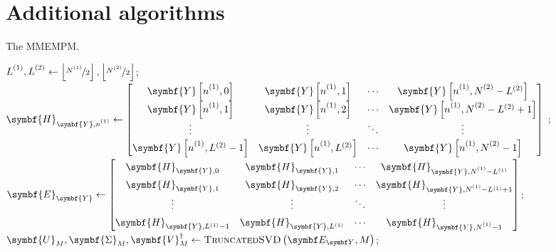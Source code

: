 \section{Additional algorithms}
\null\vfill
\begin{algorithm}[h!]
    \caption{The \acs{MMEMPM}.}
    \label{alg:mmempm}
    \begin{algorithmic}[1]
        \State $\Lone, \Ltwo \gets \left\lfloor \nicefrac{\None}{2} \right\rfloor, \left\lfloor \nicefrac{\Ntwo}{2} \right\rfloor$;
            \State  $\symbf{H}_{\symbf{Y},\none} \gets
                \def\arraystretch{1.4}
            \begin{bmatrix}
                \symbf{Y}\left[\none, 0\right] &
                \symbf{Y}\left[\none, 1\right] &
                \cdots &
                \symbf{Y}\left[\none, \Ntwo-L^{(2)}\right]\\
                \symbf{Y}\left[\none, 1\right] &
                \symbf{Y}\left[\none, 2\right] &
                \cdots &
                \symbf{Y}\left[\none, \Ntwo-L^{(2)}+1\right]\\
                \vdots & \vdots & \ddots & \vdots\\
                \symbf{Y}\left[\none, L^{(2)} - 1\right] &
                \symbf{Y}\left[\none, L^{(2)}\right] &
                \cdots &
                \symbf{Y}\left[\none, \Ntwo-1\right]\\
            \end{bmatrix}
        $
        \EndFor;
        \State $\symbf{E}_{\symbf{Y}} \gets
        \begin{bmatrix}
            \symbf{H}_{\symbf{Y},0} & \symbf{H}_{\symbf{Y},1} & \cdots & \symbf{H}_{\symbf{Y},\None - L^{(1)}}\\
            \symbf{H}_{\symbf{Y},1} & \symbf{H}_{\symbf{Y},2} & \cdots & \symbf{H}_{\symbf{Y},\None - L^{(1)} + 1}\\
            \vdots & \vdots & \ddots & \vdots\\
            \symbf{H}_{\symbf{Y},L^{(1)} - 1} & \symbf{H}_{\symbf{Y},L^{(1)}} & \cdots & \symbf{H}_{\symbf{Y},\None - 1}
        \end{bmatrix}
        $;
        \State $\symbf{U}_M^{\vphantom{\dagger}},
            \symbf{\Sigma}_M^{\vphantom{\dagger}},
            \symbf{V}_M^{\dagger} \gets
            \textsc{TruncatedSVD}\left(\EY, M\right)$;

\end{algorithmic}
\end{algorithm}
